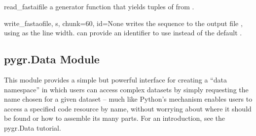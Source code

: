 \documentclass{howto}
\begin{document}
\begin{funcdesc}{read_fasta}{ifile}
  a generator function
  that yields tuples of  from .  
\end{funcdesc}

\begin{funcdesc}{write_fasta}{ofile, s, chunk=60, id=None}
  writes the sequence 
  to the output file , using  as the line width.
   can provide an identifier to use instead of the default 
  .
\end{funcdesc}

\subsection{pygr.Data Module}
\label{pygrData-module}
This module provides a simple but powerful interface for creating
a ``data namespace'' in which users can access complex datasets
by simply requesting the name chosen for a given dataset -- much
like Python's  mechanism enables users to access
a specified code resource by name, without worrying about where it
should be found or how to assemble its many parts.  For an introduction,
see the pygr.Data tutorial.
\end{document}
